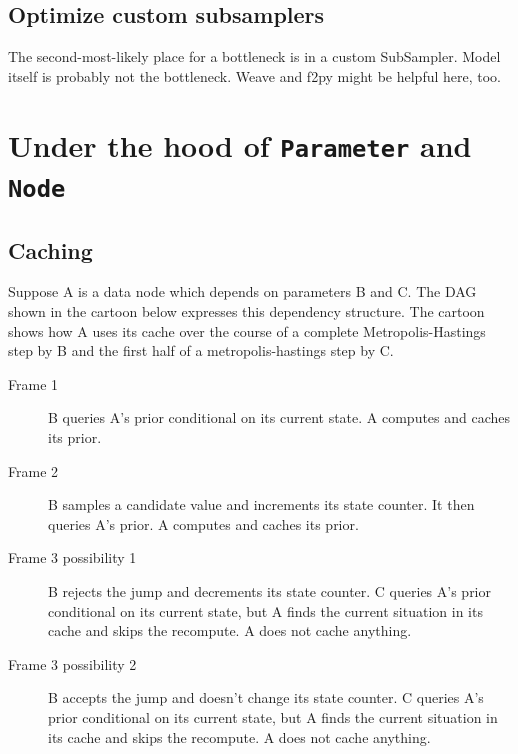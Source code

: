 \documentclass[]{book}
\begin{document}
\subsection{Optimize custom subsamplers}\label{sub:optimize_custom_subsamplers}
The second-most-likely place for a bottleneck is in a custom SubSampler. Model itself is probably not the bottleneck. Weave and f2py might be helpful here, too.

\section{Under the hood of \texttt{Parameter} and \texttt{Node}}\label{sec:underhood} %

\subsection{Caching}\label{sub:caching}

Suppose A  is a data node which depends on parameters  B  and  C. The DAG shown in the cartoon below expresses this dependency structure. The cartoon shows how A uses its cache over the course of a complete Metropolis-Hastings step by B and the first half of a metropolis-hastings step by C.

\begin{description}
\item[Frame 1] B queries A's prior conditional on its current state. A computes and caches its prior.
\begin{center}
\end{center}

\item[Frame 2] B samples a candidate value and increments its state counter. It then queries A's prior. A computes and caches its prior.
\begin{center}
\end{center}

\item[Frame 3 possibility 1] B rejects the jump and decrements its state counter. C queries A's prior conditional on its current state, but A finds the current situation in its cache and skips the recompute. A does not cache anything.
\begin{center}
\end{center}

\item[Frame 3 possibility 2] B accepts the jump and doesn't change its state counter. C queries A's prior conditional on its current state, but A finds the current situation in its cache and skips the recompute. A does not cache anything.
\begin{center}
\end{center}

\end{description}
\end{document}
